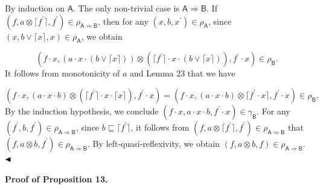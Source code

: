 By induction on $\mathsf{A}$. The only non-trivial case is $\mathsf{A}\Rightarrow\mathsf{B}$. If $(f,a\otimes\lceil f^{\prime}\rceil,f^{\prime})\in\rho_{\mathsf{A}\Rightarrow%
\mathsf{B}}$, then for any $(x,b,x^{\prime})\in\rho_{\mathsf{A}}$, since $(x,b\vee\lceil x\rceil,x)\in\rho_{\mathsf{A}}$, we obtain\par
    \[(f\cdot x,(a\cdot x\cdot(b\vee\lceil x\rceil))\otimes(\lceil f^{\prime}\rceil%
\cdot x\cdot(b\vee\lceil x\rceil)),f^{\prime}\cdot x)\in\rho_{\mathsf{B}}.\]    
It follows from monotonicity of $a$ and Lemma 23 that we have\par
    \[(f\cdot x,(a\cdot x\cdot b)\otimes(\lceil f^{\prime}\rceil\cdot x\cdot\lceil x%
\rceil),f^{\prime}\cdot x)=(f\cdot x,(a\cdot x\cdot b)\otimes\lceil f^{\prime}%
\cdot x\rceil,f^{\prime}\cdot x)\in\rho_{\mathsf{B}}.\]    
By the induction hypothesis, we conclude $(f\cdot x,a\cdot x\cdot b,f^{\prime}\cdot x)\in\gamma_{\mathsf{B}}$. For any $(f^{\prime},b,f^{\prime})\in\rho_{\mathsf{A}\Rightarrow\mathsf{B}}$, since $b\sqsubseteq\lceil f^{\prime}\rceil$, it follows from $(f,a\otimes\lceil f^{\prime}\rceil,f^{\prime})\in\rho_{\mathsf{A}\Rightarrow%
\mathsf{B}}$ that $(f,a\otimes b,f^{\prime})\in\rho_{\mathsf{A}\Rightarrow\mathsf{B}}$. By left-quasi-reflexivity, we obtain $(f,a\otimes b,f)\in\rho_{\mathsf{A}\Rightarrow\mathsf{B}}$. $\hfill\blacktriangleleft$\par
 
 
 
 
\par\medskip\noindent\textbf{Proof of Proposition 13.}\par
 
 
